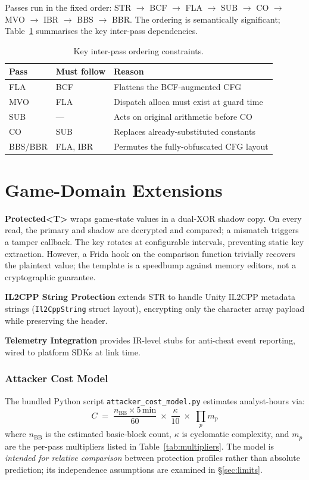 \documentclass[conference]{IEEEtran}
\begin{document}
Passes run in the fixed order:
STR $\to$ BCF $\to$ FLA $\to$ SUB $\to$ CO $\to$ MVO $\to$ IBR $\to$ BBS $\to$ BBR.
The ordering is semantically significant; Table~\ref{tab:ordering}
summarises the key inter-pass dependencies.

\begin{table}[t]
\centering
\caption{Key inter-pass ordering constraints.}
\label{tab:ordering}
\footnotesize
\begin{tabular}{lll}
\toprule
Pass & Must follow & Reason \\
\midrule
FLA & BCF  & Flattens the BCF-augmented CFG \\
MVO & FLA  & Dispatch alloca must exist at guard time \\
SUB & ---  & Acts on original arithmetic before CO \\
CO  & SUB  & Replaces already-substituted constants \\
BBS/BBR & FLA, IBR & Permutes the fully-obfuscated CFG layout \\
\bottomrule
\end{tabular}
\end{table}

\section{Game-Domain Extensions}
\label{sec:game-passes}

\textbf{Protected\textless T\textgreater} wraps game-state values in
a dual-XOR shadow copy.
On every read, the primary and shadow are decrypted and compared;
a mismatch triggers a tamper callback.
The key rotates at configurable intervals, preventing static key
extraction.
However, a Frida hook on the comparison function trivially recovers
the plaintext value; the template is a speedbump against memory editors,
not a cryptographic guarantee.

\textbf{IL2CPP String Protection} extends STR to handle Unity IL2CPP
metadata strings (\texttt{Il2CppString} struct layout), encrypting only
the character array payload while preserving the header.

\textbf{Telemetry Integration} provides IR-level stubs for anti-cheat
event reporting, wired to platform SDKs at link time.

\subsubsection*{Attacker Cost Model}
The bundled Python script \texttt{at\-tack\-er\_cost\_mod\-el.py} estimates
analyst-hours via:
\[
  C \;=\; \frac{n_\mathrm{BB} \times 5\,\text{min}}{60}
          \;\times\; \frac{\kappa}{10}
          \;\times\; \prod_{p} m_p
\]
where $n_\mathrm{BB}$ is the estimated basic-block count, $\kappa$ is cyclomatic
complexity, and $m_p$ are the per-pass multipliers listed in
Table~\ref{tab:multipliers}.  The model is \emph{intended for relative comparison}
between protection profiles rather than absolute prediction; its independence
assumptions are examined in \S\ref{sec:limits}.
\end{document}

